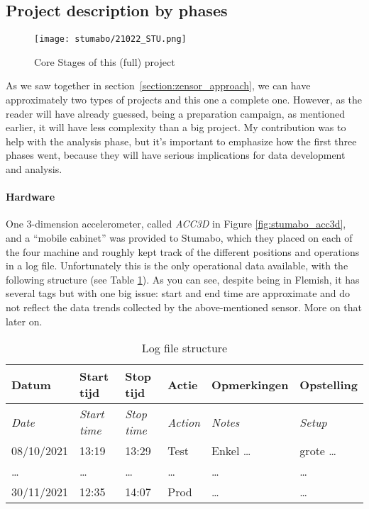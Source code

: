 \subsection{Project description by phases}
\begin{figure}[ht]
    \texttt{[image: stumabo/21022\_STU.png]}
    \caption{Core Stages of this (full) project}
    \label{fig:stumabo_stages}
\end{figure}
As we saw together in section~\ref{section:zensor_approach}, we can have approximately two types of projects and this one a complete one.
However, as the reader will have already guessed, being a preparation campaign, as mentioned earlier, it will have less complexity than a big project.
My contribution was to help with the analysis phase, but it's important to emphasize how the first three phases went, because they will have serious implications for data development and analysis.


\paragraph{Hardware} One 3-dimension accelerometer, called \textit{ACC3D} in Figure \ref{fig:stumabo_acc3d}, and a ``mobile cabinet'' was provided to Stumabo, 
which they placed on each of the four machine and roughly kept track of the different positions and operations in a log file.
Unfortunately this is the only operational data available, with the following structure (see Table \ref{tab:stu_logfile}).
As you can see, despite being in Flemish, it has several tags but with one big issue: start and end time are approximate and do not reflect the data trends collected by the above-mentioned sensor.
More on that later on. 

\begin{table}[h]
    \centering
    \begin{tabularx}{\textwidth}{llllll}
        \toprule
        Datum & Start tijd & Stop tijd & Actie & Opmerkingen & Opstelling \\\midrule
        \textit{Date} & \textit{Start time} & \textit{Stop time} & \textit{Action} & \textit{Notes} & \textit{Setup} \\\midrule
        08/10/2021 & 13:19 & 13:29 & Test & Enkel \dots & grote \dots \\ %
        \midrule
        \dots & \dots & \dots & \dots & \dots & \dots \\\midrule
        30/11/2021 & 12:35 & 14:07 & Prod & \dots & \dots \\\bottomrule
    \end{tabularx}
    \caption{Log file structure}
    \label{tab:stu_logfile}
\end{table}

